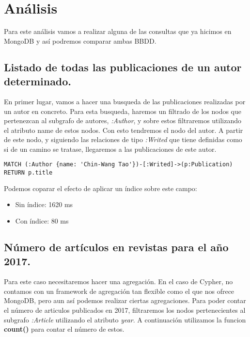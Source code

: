 \section{Análisis}

Para este análisis vamos a realizar alguna de las consultas que ya hicimos en MongoDB y así podremos comparar ambas \gls{BBDD}.

\subsection{Listado de todas las publicaciones de un autor determinado.}

En primer lugar, vamos a hacer una busqueda de las publicaciones realizadas por un autor en concreto. Para esta busqueda, haremos un filtrado de los nodos que pertenezcan al subgrafo de autores, \textit{:Author}, y sobre estos filtraremos utilizando el atributo \gls{name} de estos nodos. Con esto tendremos el nodo del autor. A partir de este nodo, y siguiendo las relaciones de tipo \textit{:Writed} que tiene definidas como si de un camino se tratase, llegaremos a las publicaciones de este autor.

\begin{verbatim}
MATCH (:Author {name: 'Chin-Wang Tao'})-[:Writed]->(p:Publication)
RETURN p.title
\end{verbatim}

Podemos coparar el efecto de aplicar un índice sobre este campo:

\begin{itemize}
 \item Sin índice: 1620 ms
 \item Con índice: 80 ms
\end{itemize}


\subsection{Número de artículos en revistas para el año 2017.}

Para este caso necesitaremos hacer una agregación. En el caso de Cypher, no contamos con un framework de agregación tan flexible como el que nos ofrece MongoDB, pero aun así podemos realizar ciertas agregaciones. Para poder contar el número de articulos publicados en 2017, filtraremos los nodos pertenecientes al subgrafo \textit{:Article} utilizando el atributo \textit{year}. A continuación utilizamos la funcion \textbf{count()} para contar el número de estos.

